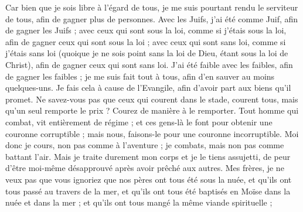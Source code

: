 \begin{multicols}{2}
Car bien que je sois libre à l'égard de tous, je me suis pourtant rendu le serviteur de tous, afin de gagner plus de personnes.
Avec les Juifs, j’ai été comme Juif, afin de gagner les Juifs ; avec ceux qui sont sous la loi, comme si j'étais sous la loi, afin de gagner ceux qui sont sous la loi ;
avec ceux qui sont sans loi, comme si j'étais sans loi (quoique je ne sois point sans la loi de Dieu, étant sous la loi de Christ), afin de gagner ceux qui sont sans loi.
J’ai été faible avec les faibles, afin de gagner les faibles ; je me suis fait tout à tous, afin d’en sauver au moins quelques-uns.
Je fais cela à cause de l'Evangile, afin d’avoir part aux biens qu’il promet.
Ne savez-vous pas que ceux qui courent dans le stade, courent tous, mais qu’un seul remporte le prix ? Courez de manière à le remporter.
Tout homme qui combat, vit entièrement de régime ; et ces gens-là le font pour obtenir une couronne corruptible ; mais nous, faisons-le pour une couronne incorruptible.
Moi donc je cours, non pas comme à l’aventure ; je combats, mais non pas comme battant l'air.
Mais je traite durement mon corps et je le tiens assujetti, de peur d’être moi-même désapprouvé après avoir prêché aux autres.
\VerseOne{}Mes frères, je ne veux pas que vous ignoriez que nos pères ont tous été sous la nuée, et qu'ils ont tous passé au travers de la mer,
et qu'ils ont tous été baptisés en Moïse dans la nuée et dans la mer ;
et qu'ils ont tous mangé la même viande spirituelle ;

\end{multicols}
